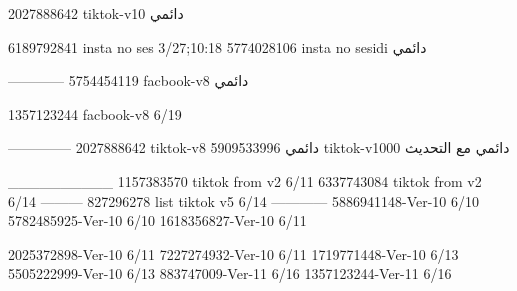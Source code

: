 2027888642 tiktok-v10
دائمي

6189792841 insta no ses
3/27;10:18
5774028106 insta no sesidi
دائمي

------------
5754454119 facbook-v8
دائمي

1357123244 facbook-v8
6/19

--------------
2027888642 tiktok-v8
دائمي
5909533996 tiktok-v1000
دائمي مع التحديث

__________
1157383570 tiktok from v2
6/11
6337743084 tiktok from v2
6/14
---------
827296278 list tiktok v5
6/14
------------
5886941148-Ver-10
6/10
5782485925-Ver-10
6/10
1618356827-Ver-10
6/11

2025372898-Ver-10
6/11
7227274932-Ver-10
6/11
1719771448-Ver-10
6/13
5505222999-Ver-10
6/13
883747009-Ver-11
6/16
1357123244-Ver-11
6/16
